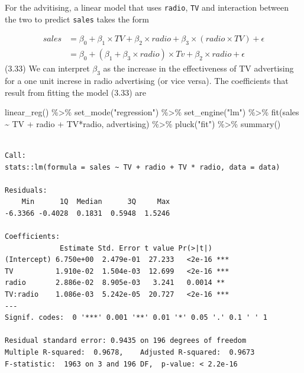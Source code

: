 \documentclass[
  letterpaper,
  DIV=11,
  numbers=noendperiod]{scrreprt}
\newenvironment{Shaded}{\begin{snugshade}}{\end{snugshade}}
\newcommand{\FunctionTok}[1]{\textcolor[rgb]{0.02,0.16,0.49}{#1}}
\newcommand{\NormalTok}[1]{\textcolor[rgb]{0.33,0.33,0.33}{#1}}
\newcommand{\SpecialCharTok}[1]{\textcolor[rgb]{0.00,0.46,0.62}{#1}}
\newcommand{\StringTok}[1]{\textcolor[rgb]{0.00,0.50,0.00}{#1}}
\begin{document}
For the advitising, a linear model that uses \texttt{radio}, \texttt{TV}
and interaction between the two to predict \texttt{sales} takes the form

\[
\begin{align}
sales &= \beta_0 + \beta_1 \times TV + \beta_2 \times radio + \beta_3 \times(radio \times TV) + \epsilon \\
&= \beta_0 + (\beta_1 + \beta_3 \times radio)\times Tv + \beta_2 \times radio + \epsilon
\end{align}
\] (3.33) We can interpret \(\beta_3\) as the increase in the
effectiveness of TV advertising for a one unit increse in radio
advertising (or vice versa). The coefficients that result from fitting
the model (3.33) are

\begin{Shaded}
\begin{Highlighting}[]
\FunctionTok{linear\_reg}\NormalTok{() }\SpecialCharTok{\%\textgreater{}\%} 
  \FunctionTok{set\_mode}\NormalTok{(}\StringTok{"regression"}\NormalTok{) }\SpecialCharTok{\%\textgreater{}\%} 
  \FunctionTok{set\_engine}\NormalTok{(}\StringTok{"lm"}\NormalTok{) }\SpecialCharTok{\%\textgreater{}\%} 
  \FunctionTok{fit}\NormalTok{(sales }\SpecialCharTok{\textasciitilde{}}\NormalTok{ TV }\SpecialCharTok{+}\NormalTok{ radio }\SpecialCharTok{+}\NormalTok{ TV}\SpecialCharTok{*}\NormalTok{radio, advertising) }\SpecialCharTok{\%\textgreater{}\%} 
  \FunctionTok{pluck}\NormalTok{(}\StringTok{"fit"}\NormalTok{) }\SpecialCharTok{\%\textgreater{}\%} 
  \FunctionTok{summary}\NormalTok{()}
\end{Highlighting}
\end{Shaded}

\begin{verbatim}

Call:
stats::lm(formula = sales ~ TV + radio + TV * radio, data = data)

Residuals:
    Min      1Q  Median      3Q     Max 
-6.3366 -0.4028  0.1831  0.5948  1.5246 

Coefficients:
             Estimate Std. Error t value Pr(>|t|)    
(Intercept) 6.750e+00  2.479e-01  27.233   <2e-16 ***
TV          1.910e-02  1.504e-03  12.699   <2e-16 ***
radio       2.886e-02  8.905e-03   3.241   0.0014 ** 
TV:radio    1.086e-03  5.242e-05  20.727   <2e-16 ***
---
Signif. codes:  0 '***' 0.001 '**' 0.01 '*' 0.05 '.' 0.1 ' ' 1

Residual standard error: 0.9435 on 196 degrees of freedom
Multiple R-squared:  0.9678,    Adjusted R-squared:  0.9673 
F-statistic:  1963 on 3 and 196 DF,  p-value: < 2.2e-16
\end{verbatim}
\end{document}
